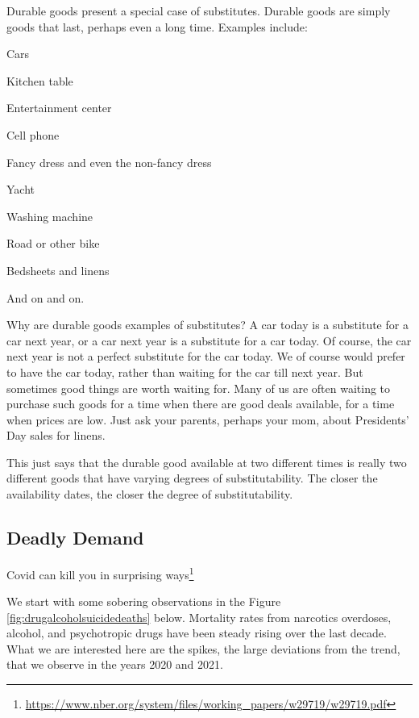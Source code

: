 \documentclass[
]{book}
\begin{document}
Durable goods present a special case of substitutes. Durable goods are simply goods that last, perhaps even a long time. Examples include:

\begin{center}
Cars

Kitchen table

Entertainment center

Cell phone

Fancy dress and even the non-fancy dress

Yacht

Washing machine

Road or other bike

Bedsheets and linens

And on and on.

\end{center}

Why are durable goods examples of substitutes? A car today is a substitute for a car next year, or a car next year is a substitute for a car today. Of course, the car next year is not a perfect substitute for the car today. We of course would prefer to have the car today, rather than waiting for the car till next year. But sometimes good things are worth waiting for. Many of us are often waiting to purchase such goods for a time when there are good deals available, for a time when prices are low. Just ask your parents, perhaps your mom, about Presidents' Day sales for linens.

This just says that the durable good available at two different times is really two different goods that have varying degrees of substitutability. The closer the availability dates, the closer the degree of substitutability.

\hypertarget{deadly-demand}{%
\subsection{Deadly Demand}\label{deadly-demand}}

Covid can kill you in surprising ways\footnote{
  \url{https://www.nber.org/system/files/working_papers/w29719/w29719.pdf}}

We start with some sobering observations in the Figure \ref{fig:drugalcoholsuicidedeaths} below. Mortality rates from narcotics overdoses, alcohol, and psychotropic drugs have been steady rising over the last decade. What we are interested here are the spikes, the large deviations from the trend, that we observe in the years 2020 and 2021.
\end{document}
